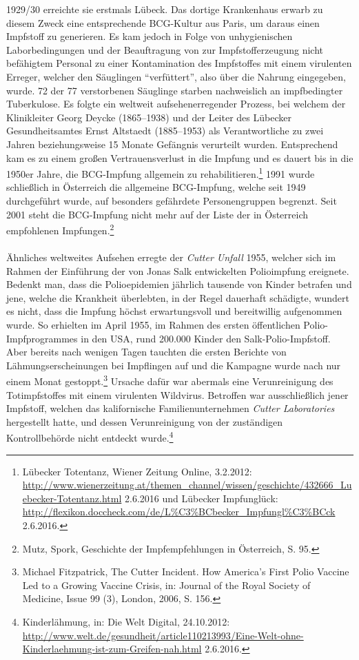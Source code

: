 \documentclass[
    a4paper,
    12pt,
    hyphens,
    chapterprefix=true,
    headheight=33pt,
    footheight=29pt,
    headings=optiontohead, %
]{scrartcl}
\begin{document}
1929/30 erreichte sie erstmals Lübeck. Das dortige Krankenhaus erwarb zu diesem Zweck eine entsprechende BCG-Kultur aus Paris,
um daraus einen Impfstoff zu generieren. Es kam jedoch in Folge von unhygienischen Laborbedingungen und der Beauftragung von zur Impfstofferzeugung
nicht befähigtem Personal zu einer Kontamination des Impfstoffes mit einem virulenten Erreger, welcher den Säuglingen "`verfüttert"',
also über die Nahrung eingegeben, wurde. 72 der 77 verstorbenen Säuglinge starben nachweislich an impfbedingter Tuberkulose.
Es folgte ein weltweit aufsehenerregender Prozess, bei welchem der Klinikleiter Georg Deycke (1865--1938) und der Leiter des Lübecker Gesundheitsamtes
Ernst Altstaedt (1885--1953) als Verantwortliche zu zwei Jahren beziehungsweise 15 Monate Gefängnis verurteilt wurden. Entsprechend kam es zu
einem großen Vertrauensverlust in die Impfung und es dauert bis in die 1950er Jahre, die BCG-Impfung allgemein zu rehabilitieren.\footnote{Lübecker Totentanz, Wiener Zeitung Online, 3.2.2012: \url{http://www.wienerzeitung.at/themen_channel/wissen/geschichte/432666_Luebecker-Totentanz.html} 2.6.2016 und
Lübecker Impfunglück: \url{http://flexikon.doccheck.com/de/L\%C3\%BCbecker_Impfungl\%C3\%BCck} 2.6.2016.}
1991 wurde schließlich in Österreich die allgemeine BCG-Impfung, welche seit 1949 durchgeführt wurde, auf besonders
gefährdete Personengruppen begrenzt. Seit 2001 steht die BCG-Impfung nicht mehr auf der Liste der in Österreich empfohlenen
Impfungen.\footnote{Mutz, Spork, Geschichte der Impfempfehlungen in Österreich, S. 95.}\\
\\
Ähnliches weltweites Aufsehen erregte der \textit{Cutter Unfall} 1955, welcher sich im Rahmen der Einführung der von Jonas
Salk entwickelten Polioimpfung ereignete. Bedenkt man, dass die Polioepidemien jährlich tausende von Kinder betrafen und jene,
welche die Krankheit überlebten, in der Regel dauerhaft schädigte, wundert es nicht, dass die Impfung höchst erwartungsvoll und bereitwillig aufgenommen wurde. So erhielten im April 1955, im Rahmen des ersten öffentlichen
Polio-Impfprogrammes in den USA, rund 200.000 Kinder den Salk-Polio-Impfstoff. Aber bereits nach wenigen Tagen tauchten die
ersten Berichte von Lähmungserscheinungen bei Impflingen auf und die Kampagne wurde nach nur einem Monat gestoppt.\footnote{Michael Fitzpatrick, The Cutter Incident. How America's First Polio Vaccine Led to a Growing Vaccine Crisis, in:
Journal of the Royal Society of Medicine, Issue 99 (3), London, 2006, S. 156.}
Ursache dafür war abermals eine Verunreinigung des Totimpfstoffes mit einem virulenten Wildvirus. Betroffen war ausschließlich jener Impfstoff, welchen das kalifornische Familienunternehmen \textit{Cutter Laboratories} hergestellt hatte, und dessen Verunreinigung von der zuständigen Kontrollbehörde nicht entdeckt wurde.\footnote{Kinderlähmung, in: Die Welt Digital,
24.10.2012: \url{http://www.welt.de/gesundheit/article110213993/Eine-Welt-ohne-Kinderlaehmung-ist-zum-Greifen-nah.html} 2.6.2016.}
\end{document}
